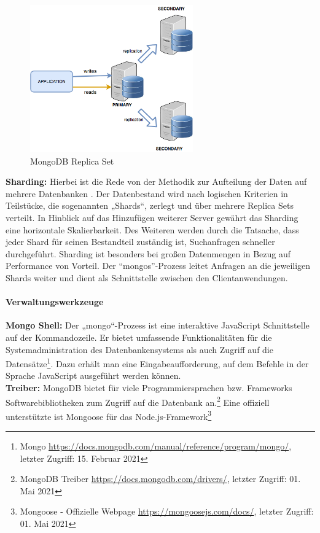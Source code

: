 \begin{figure}[tbt]
\centering
\includegraphics[width=7cm]{images/replicaset1.png}
\caption{MongoDB Replica Set}
\label{fig:ReplicaSet}
\end{figure}


\noindent
{}
\textbf{Sharding:}
Hierbei ist die Rede von der Methodik zur Aufteilung der Daten auf mehrere Datenbanken \cite{DB4.1}.
Der Datenbestand wird nach logischen Kriterien in  Teilstücke, die sogenannten „Shards“, zerlegt und über mehrere Replica Sets verteilt.
In Hinblick auf das Hinzufügen weiterer Server gewährt das Sharding eine horizontale Skalierbarkeit.
Des Weiteren werden durch die Tatsache, dass jeder Shard für seinen Bestandteil zuständig ist,  Suchanfragen schneller durchgeführt. 
Sharding ist besonders bei großen Datenmengen in Bezug auf Performance von Vorteil.
Der \enquote{mongos}-Prozess leitet Anfragen an die jeweiligen Shards weiter und dient als Schnittstelle zwischen den Clientanwendungen.

\paragraph{Verwaltungswerkzeuge}
\noindent
{}
\textbf{Mongo Shell:}
Der „mongo“-Prozess ist eine interaktive JavaScript Schnittstelle auf der Kommandozeile. Er bietet umfassende Funktionalitäten für die Systemadministration des Datenbankensystems als auch Zugriff auf die Datensätze\footnote{Mongo \url{https://docs.mongodb.com/manual/reference/program/mongo/}, letzter Zugriff: 15. Februar 2021}. Dazu erhält man eine Eingabeaufforderung, auf dem Befehle in der Sprache JavaScript ausgeführt werden können. \\

\noindent
{}
\textbf{Treiber:}
MongoDB bietet für viele Programmiersprachen bzw. Frameworks Softwarebibliotheken zum Zugriff auf die Datenbank an.\footnote{MongoDB Treiber \url{https://docs.mongodb.com/drivers/}, letzter Zugriff: 01. Mai 2021}  Eine offiziell unterstützte ist Mongoose für das Node.js-Framework\footnote{Mongoose - Offizielle Webpage \url{https://mongoosejs.com/docs/}, letzter Zugriff: 01. Mai 2021}\\

